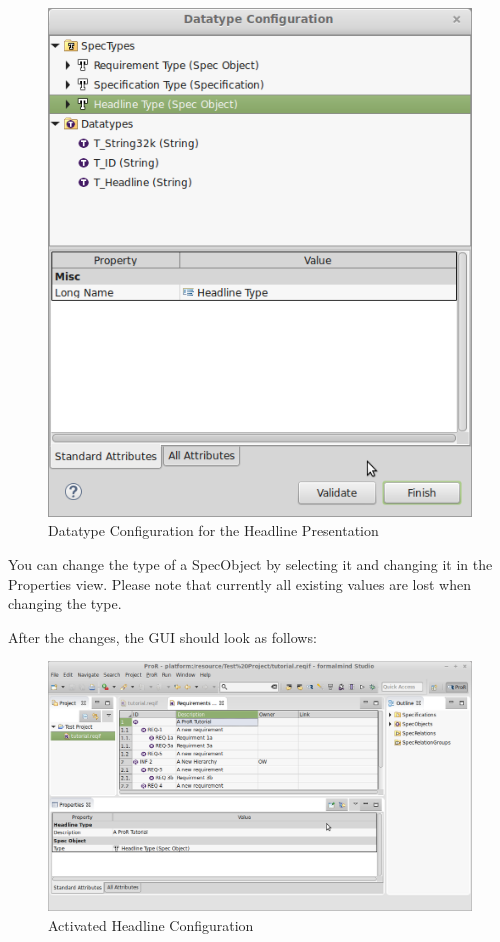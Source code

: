 \begin{figure}[h!]
\centering      
\includegraphics[width=0.8\linewidth]{../rmf-images/datatype_Headline_desc.png}      
\caption{Datatype Configuration for the Headline Presentation}      
\label{fig:headlineConfig}
\end{figure}

You can change the type of a SpecObject by selecting it and changing it in the Properties view.  Please note that currently all existing values are lost when changing the type.

After the changes, the GUI should look as follows:

\begin{figure}[h!]
\centering      
\includegraphics[width=\linewidth]{../rmf-images/desc_headline.png}      
\caption{Activated Headline Configuration}      
\label{fig:activeHeadlineConfig}
\end{figure}

